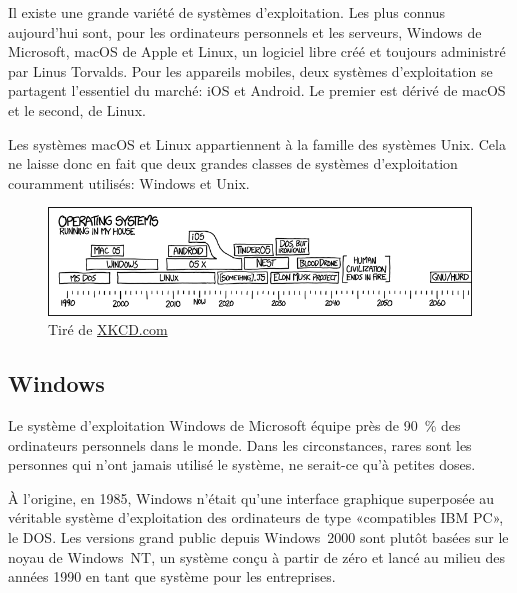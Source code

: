 Il existe une grande variété de systèmes d'exploitation. Les plus
connus aujourd'hui sont, pour les ordinateurs personnels et les
serveurs, Windows de Microsoft, macOS de
Apple et Linux, un logiciel libre créé et toujours
administré par Linus Torvalds. Pour les appareils mobiles, deux
systèmes d'exploitation se partagent l'essentiel du marché: iOS et
Android. Le premier est dérivé de macOS et le second, de Linux.

Les systèmes macOS et Linux appartiennent à
la famille des systèmes Unix. Cela ne laisse donc en fait
que deux grandes classes de systèmes d'exploitation couramment
utilisés: Windows et Unix.

\begin{figure}[t]
  \centering
  \begin{minipage}{0.9\linewidth}
    \includegraphics{images/operating_systems} \\
    \footnotesize\sffamily%
    Tiré de \href{https://xkcd.com/1508/}{XKCD.com}
  \end{minipage}
\end{figure}

\subsection{Windows}
\label{sec:informatique:os:windows}

Le système d'exploitation Windows de Microsoft équipe
près de 90~\% des ordinateurs personnels dans le monde. Dans les
circonstances, rares sont les personnes qui n'ont jamais utilisé le
système, ne serait-ce qu'à petites doses.

À l'origine, en 1985, Windows n'était qu'une interface
graphique superposée au véritable système d'exploitation des
ordinateurs de type «compatibles IBM PC», le DOS. Les versions grand
public depuis Windows~2000 sont plutôt basées sur le noyau de
Windows~NT, un système conçu à partir de zéro et lancé au milieu des
années 1990 en tant que système pour les entreprises.

